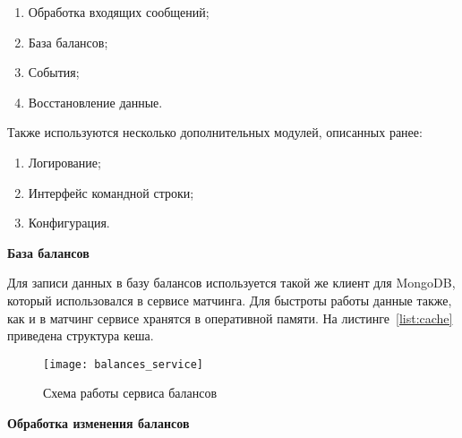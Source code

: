\begin{enumerate}
    \item Обработка входящих сообщений;
    \item База балансов;
    \item События;
    \item Восстановление данные.
\end{enumerate}

Также используются несколько дополнительных модулей, описанных ранее:


\begin{enumerate}
    \item Логирование;
    \item Интерфейс командной строки;
    \item Конфигурация.
\end{enumerate}

\textbf{База балансов}

Для записи данных в базу балансов используется такой же клиент для MongoDB, который использовался в сервисе матчинга. Для быстроты работы данные также, как и в матчинг сервисе хранятся в оперативной памяти. На листинге~\ref{list:cache} приведена структура кеша.



\begin{figure}[ht]
    \centering
    \texttt{[image: balances\_service]}
    \caption{Схема работы сервиса балансов}\label{fig:balances_service}
\end{figure}

\textbf{Обработка изменения балансов}

